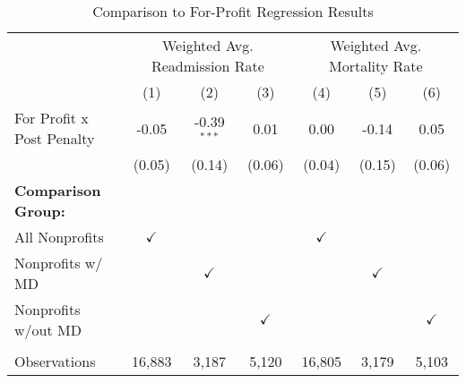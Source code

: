 \begin{table}[htbp]
   \caption{\label{tab:forprofit_fullsample} Comparison to For-Profit Regression Results}
   \bigskip
   \centering
   \begin{tabular}{lcccccc}
      \toprule
       & \multicolumn{3}{c}{Weighted Avg. Readmission Rate} & \multicolumn{3}{c}{Weighted Avg. Mortality Rate}\\
                                  & (1)           & (2)           & (3)           & (4)           & (5)           & (6)\\  
      \midrule 
      For Profit x Post Penalty   & -0.05         & -0.39$^{***}$ & 0.01          & 0.00          & -0.14         & 0.05\\   
                                  & (0.05)        & (0.14)        & (0.06)        & (0.04)        & (0.15)        & (0.06)\\   
      \textbf{Comparison Group:}  &               &               &               &               &               & \\  
      All Nonprofits              & $\checkmark$  &               &               & $\checkmark$  &               & \\  
      Nonprofits w/ MD            &               & $\checkmark$  &               &               & $\checkmark$  & \\  
      Nonprofits w/out MD         &               &               & $\checkmark$  &               &               & $\checkmark$\\   
       \\
      Observations                & 16,883        & 3,187         & 5,120         & 16,805        & 3,179         & 5,103\\  
      \bottomrule
   \end{tabular}
\end{table}
